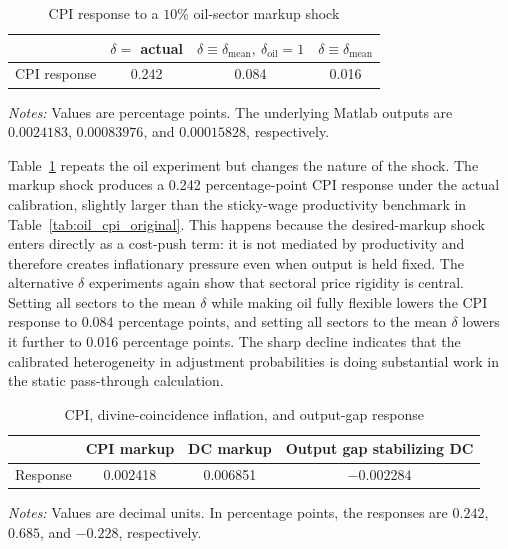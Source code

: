 \documentclass[12pt]{article}
\begin{document}
\begin{table}[htbp]
    \centering
    \caption{CPI response to a $10\%$ oil-sector markup shock}
    \label{tab:oil_markup_cpi}
    \begin{tabular}{lccc}
        \toprule
        & $\delta =$ actual
        & $\delta \equiv \delta_{\mathrm{mean}},\ \delta_{\mathrm{oil}}=1$
        & $\delta \equiv \delta_{\mathrm{mean}}$ \\
        \midrule
        CPI response & 0.242 & 0.084 & 0.016 \\
        \bottomrule
    \end{tabular}
    \begin{flushleft}
        \footnotesize
        \textit{Notes:} Values are percentage points. The underlying Matlab outputs
        are $0.0024183$, $0.00083976$, and $0.00015828$, respectively.
    \end{flushleft}
\end{table}

Table~\ref{tab:oil_markup_cpi} repeats the oil experiment but changes the nature of
the shock. The markup shock produces a 0.242 percentage-point CPI response under the
actual calibration, slightly larger than the sticky-wage productivity benchmark in
Table~\ref{tab:oil_cpi_original}. This happens because the desired-markup shock enters
directly as a cost-push term: it is not mediated by productivity and therefore creates
inflationary pressure even when output is held fixed. The alternative $\delta$
experiments again show that sectoral price rigidity is central. Setting all sectors to
the mean $\delta$ while making oil fully flexible lowers the CPI response to
0.084 percentage points, and setting all sectors to the mean $\delta$ lowers it further
to 0.016 percentage points. The sharp decline indicates that the calibrated
heterogeneity in adjustment probabilities is doing substantial work in the static
pass-through calculation.

\begin{table}[htbp]
    \centering
    \caption{CPI, divine-coincidence inflation, and output-gap response}
    \label{tab:markup_dc_response}
    \begin{tabular}{lccc}
        \toprule
        & CPI markup
        & DC markup
        & Output gap stabilizing DC \\
        \midrule
        Response & 0.002418 & 0.006851 & $-0.002284$ \\
        \bottomrule
    \end{tabular}
    \begin{flushleft}
        \footnotesize
        \textit{Notes:} Values are decimal units. In percentage points, the
        responses are $0.242$, $0.685$, and $-0.228$, respectively.
    \end{flushleft}
\end{table}
\end{document}
